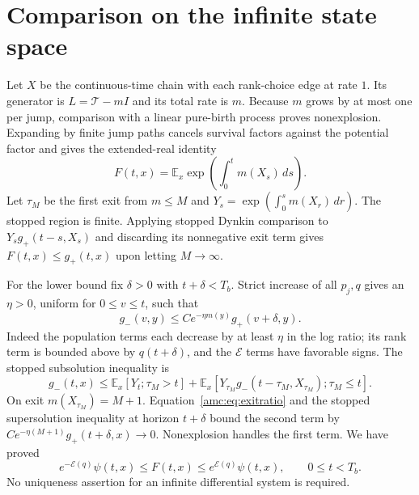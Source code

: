 \documentclass[11pt,letterpaper]{article}
\theoremstyle{remark}\newtheorem{remark}[theorem]{Remark}
\newcommand{\EE}{\mathbb E}
\newcommand{\TT}{\mathcal T}
\newcommand{\Err}{\mathcal E}
\begin{document}
\section{Comparison on the infinite state space}\label{amc:sec:comparison}
Let $X$ be the continuous-time chain with each rank-choice edge at rate $1$. Its generator is $L=\TT-mI$ and its total rate is $m$. Because $m$ grows by at most one per jump, comparison with a linear pure-birth process proves nonexplosion. Expanding by finite jump paths cancels survival factors against the potential factor and gives the extended-real identity
\begin{equation}\label{amc:eq:FK}
 F(t,x)=\EE_x\exp\left(\int_0^t m(X_s)\,ds\right).
\end{equation}
Let $\tau_M$ be the first exit from $m\le M$ and $Y_s=\exp(\int_0^s m(X_r)\,dr)$. The stopped region is finite. Applying stopped Dynkin comparison to $Y_sg_+(t-s,X_s)$ and discarding its nonnegative exit term gives $F(t,x)\le g_+(t,x)$ upon letting $M\to\infty$.

For the lower bound fix $\delta>0$ with $t+\delta<T_b$. Strict increase of all $p_j,q$ gives an $\eta>0$, uniform for $0\le v\le t$, such that
\begin{equation}\label{amc:eq:exitratio}
 g_-(v,y)\le C e^{-\eta m(y)}g_+(v+\delta,y).
\end{equation}
Indeed the population terms each decrease by at least $\eta$ in the log ratio; its rank term is bounded above by $q(t+\delta)$, and the $\Err$ terms have favorable signs. The stopped subsolution inequality is
\[
 g_-(t,x)\le\EE_x[Y_t;\tau_M>t]
 +\EE_x[Y_{\tau_M}g_-(t-\tau_M,X_{\tau_M});\tau_M\le t].
\]
On exit $m(X_{\tau_M})=M+1$. Equation~\eqref{amc:eq:exitratio} and the stopped supersolution inequality at horizon $t+\delta$ bound the second term by
$Ce^{-\eta(M+1)}g_+(t+\delta,x)\to0$. Nonexplosion handles the first term. We have proved
\begin{equation}\label{amc:eq:comparison}
 e^{-\Err(q)}\psi(t,x)\le F(t,x)\le e^{\Err(q)}\psi(t,x),
 \qquad0\le t<T_b.
\end{equation}
No uniqueness assertion for an infinite differential system is required.
\end{document}
